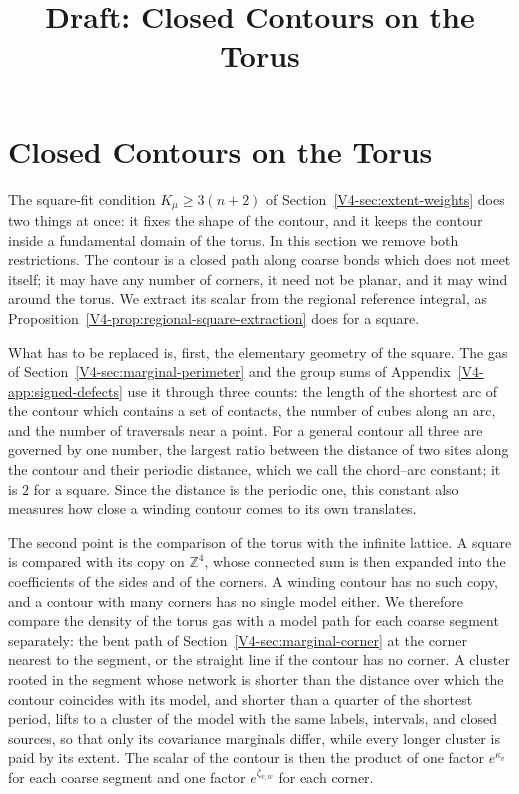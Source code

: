 \documentclass[11pt]{article}
\title{Draft: Closed Contours on the Torus}
\author{}
\date{}
\numberwithin{equation}{section}
\theoremstyle{remark}
\theoremstyle{plain}
\begin{document}
\maketitle

\section{Closed Contours on the Torus}\label{sec:torus-contours}

The square-fit condition $K_{\mu}\geqslant 3(n+2)$ of Section~\ref{V4-sec:extent-weights} does two things at once: it fixes the shape of the contour, and it keeps the contour inside a fundamental domain of the torus. In this section we remove both restrictions. The contour is a closed path along coarse bonds which does not meet itself; it may have any number of corners, it need not be planar, and it may wind around the torus. We extract its scalar from the regional reference integral, as Proposition~\ref{V4-prop:regional-square-extraction} does for a square.

What has to be replaced is, first, the elementary geometry of the square. The gas of Section~\ref{V4-sec:marginal-perimeter} and the group sums of Appendix~\ref{V4-app:signed-defects} use it through three counts: the length of the shortest arc of the contour which contains a set of contacts, the number of cubes along an arc, and the number of traversals near a point. For a general contour all three are governed by one number, the largest ratio between the distance of two sites along the contour and their periodic distance, which we call the chord--arc constant; it is $2$ for a square. Since the distance is the periodic one, this constant also measures how close a winding contour comes to its own translates.

The second point is the comparison of the torus with the infinite lattice. A square is compared with its copy on $\mathbb Z^4$, whose connected sum is then expanded into the coefficients of the sides and of the corners. A winding contour has no such copy, and a contour with many corners has no single model either. We therefore compare the density of the torus gas with a model path for each coarse segment separately: the bent path of Section~\ref{V4-sec:marginal-corner} at the corner nearest to the segment, or the straight line if the contour has no corner. A cluster rooted in the segment whose network is shorter than the distance over which the contour coincides with its model, and shorter than a quarter of the shortest period, lifts to a cluster of the model with the same labels, intervals, and closed sources, so that only its covariance marginals differ, while every longer cluster is paid by its extent. The scalar of the contour is then the product of one factor $e^{\kappa_v}$ for each coarse segment and one factor $e^{\zeta_{v,w}}$ for each corner.
\end{document}
